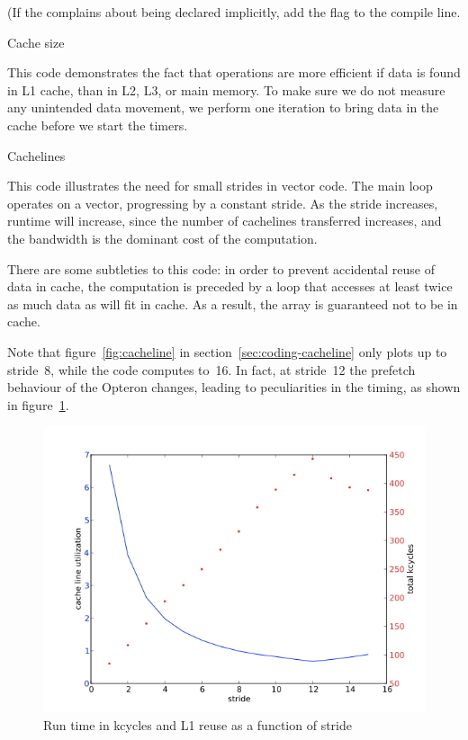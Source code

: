 (If the  complains about
 being declared implicitly, add the 
flag to the compile line.

 {Cache size}
\label{sec:cachesize-code}

This code demonstrates the fact that operations are more efficient if
data is found in L1 cache, than in L2, L3, or main memory. To make
sure we do not measure any unintended data movement, we perform one
iteration to bring data in the cache before we start the timers.

\begingroup\small

\endgroup

 {Cachelines}
\label{sec:cacheline-code}

This code illustrates the need for small strides in vector code. The
main loop operates on a vector, progressing by a constant stride. As
the stride increases, runtime will increase, since the number of
cachelines transferred increases, and the bandwidth is the dominant
cost of the computation.

There are some subtleties to this code: in order to prevent accidental
reuse of data in cache, the computation is preceded by a loop that
accesses at least twice as much data as will fit in cache. As a
result, the array is guaranteed not to be in cache.

\begingroup\small

\endgroup

Note that figure~\ref{fig:cacheline} in
section~\ref{sec:coding-cacheline} only plots up to stride~8, while
the code computes to~16. In fact, at stride~12 the prefetch behaviour
of the Opteron changes, leading to peculiarities in the timing, as
shown in figure~\ref{fig:cacheline16}.
\begin{figure}[ht]
  \includegraphics[scale=.5]{graphics/cacheline16}
  \caption{Run time in kcycles and L1 reuse as a function of stride}
  \label{fig:cacheline16}
\end{figure}

